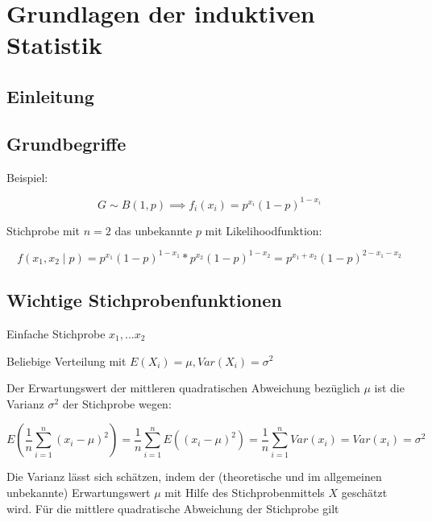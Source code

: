 \documentclass[a4paper]{article}
\title{\docTitle}
\author{Moritz}
\date{\today}
\begin{document}
\maketitle
\tableofcontents


\section{Grundlagen der induktiven Statistik}

\subsection{Einleitung}

\subsection{Grundbegriffe}


Beispiel:

\[
G \sim B(1, p) \implies f_i(x_i) = p^{x_i} (1-p)^{1-x_i}
\]

Stichprobe mit $n=2$ das unbekannte $p$ mit Likelihoodfunktion:

\[
f(x_1, x_2 \mid p) = p^{x_1} (1-p)^{1-x_1} * p^{x_2} (1-p)^{1-x_2} = p^{x_1 + x_2} (1-p)^{2-x_1-x_2}
\]

\subsection{Wichtige Stichprobenfunktionen}

Einfache Stichprobe $x_1,... x_2$

Beliebige Verteilung mit $E(X_i) = \mu, Var(X_i) = \sigma^2$

Der Erwartungswert der mittleren quadratischen Abweichung bezüglich $\mu$ ist die Varianz $\sigma^2$ der Stichprobe wegen:

\[
E(\frac{1}{n} \sum_{i=1}^{n}(x_i-\mu)^2) = \frac{1}{n} \sum_{i=1}^{n}E((x_i-\mu)^2) = \frac{1}{n} \sum_{i=1}^{n} Var(x_i) = Var(x_i) = \sigma^2
\]

Die Varianz lässt sich schätzen, indem der (theoretische und im allgemeinen unbekannte) Erwartungswert $\mu$ mit Hilfe des Stichprobenmittels $X$ geschätzt wird. Für die mittlere quadratische Abweichung der Stichprobe gilt
\end{document}
